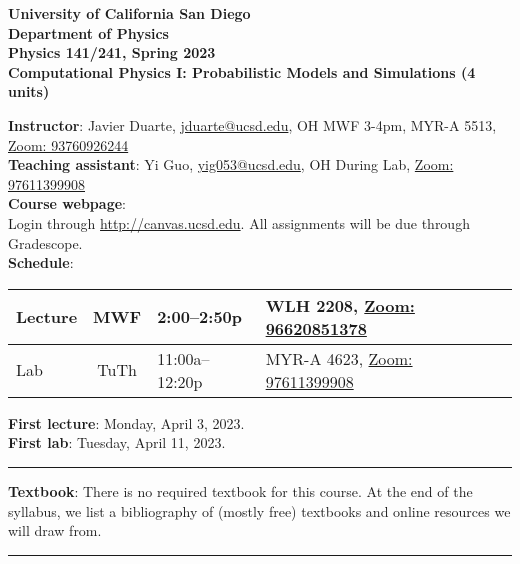 \documentclass[12pt]{article}
\begin{document}
\begin{center}
  \textbf{
    University of California San Diego\\
    Department of Physics\\
    Physics 141/241, Spring 2023\\
    Computational Physics I: Probabilistic Models and Simulations (4 units)
  }
\end{center}

\noindent\textbf{Instructor}: Javier Duarte, \href{mailto:jduarte@ucsd.edu}{jduarte@ucsd.edu}, OH MWF 3-4pm, MYR-A 5513, \href{https://ucsd.zoom.us/j/93760926244}{Zoom: 93760926244}\\
\noindent \textbf{Teaching assistant}: Yi Guo, \href{mailto:yig053@ucsd.edu}{yig053@ucsd.edu}, OH During Lab, \href{https://ucsd.zoom.us/j/97611399908}{Zoom: 97611399908}\\

\noindent\textbf{Course webpage}:\\
\hspace*{1cm}Login through \href{http://canvas.ucsd.edu}{http://canvas.ucsd.edu}. 
All assignments will be due through Gradescope.\\

\noindent\textbf{Schedule}:
\begin{center}
  \begin{tabular}{|l|c|l|m{90mm}|}
    \hline
    Lecture & MWF  & 2:00--2:50p    & WLH 2208, \href{https://ucsd.zoom.us/j/96620851378}{Zoom: 96620851378}   \\\hline
    Lab     & TuTh & 11:00a--12:20p & MYR-A 4623, \href{https://ucsd.zoom.us/j/97611399908}{Zoom: 97611399908} \\\hline\end{tabular}
\end{center}

\noindent\textbf{First lecture}: Monday, April 3, 2023.\\ 
\textbf{First lab}: Tuesday, April 11, 2023.

\begin{center}
  \rule{\textwidth}{0.5pt}
\end{center}

\noindent\textbf{Textbook}: There is no required textbook for this course.
At the end of the syllabus, we list a bibliography of (mostly free) textbooks and online resources we will draw from.

\begin{center}
  \rule{\textwidth}{0.5pt}
\end{center}
\end{document}
